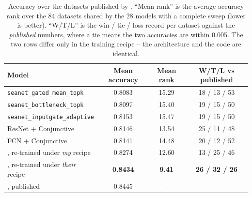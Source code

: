 \begin{table}[tbp]
\caption{Accuracy over the \ucr{} datasets published by \millet{}. ``Mean rank'' is the average
accuracy rank over the 84 datasets shared by the 28 models with a complete sweep (lower is better).
``W/T/L'' is the win / tie / loss record per dataset against the \emph{published} \millet{}
numbers, where a tie means the two accuracies are within 0.005. The two \millet{} rows differ only
in the training recipe -- the architecture and the code are identical.}
\label{tab:ucr_accuracy}
\begin{center}
\footnotesize
\begin{tabular}{lccc}
\toprule
\textbf{Model} & \textbf{Mean accuracy} & \textbf{Mean rank} &
\textbf{W/T/L vs published} \\
\midrule
\texttt{seanet\_gated\_mean\_topk}   & 0.8083 & 15.29 & 18 / 13 / 53 \\
\texttt{seanet\_bottleneck\_topk}    & 0.8097 & 15.40 & 19 / 15 / 50 \\
\texttt{seanet\_inputgate\_adaptive} & 0.8153 & 15.47 & 19 / 15 / 50 \\
ResNet + Conjunctive         & 0.8146 & 13.54 & 25 / 11 / 48 \\
FCN + Conjunctive            & 0.8141 & 14.48 & 20 / 12 / 52 \\
\midrule
\millet{}, re-trained under \emph{my} recipe   & 0.8274 & 12.60 & 13 / 25 / 46 \\
\millet{}, re-trained under \emph{their} recipe & \textbf{0.8434} & \textbf{9.41} &
                                                  \textbf{26 / 32 / 26} \\
\midrule
\millet{} \citep{early2024millet}, published & 0.8445 & -- & -- \\
\bottomrule
\end{tabular}
\end{center}
\end{table}

